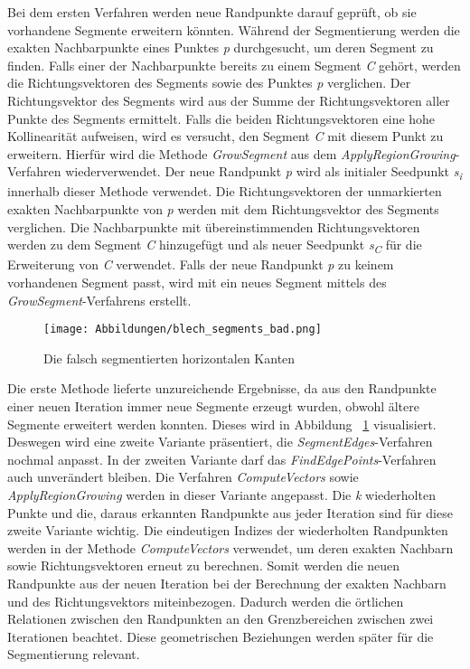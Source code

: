 Bei dem ersten Verfahren werden neue Randpunkte darauf geprüft, ob sie vorhandene Segmente erweitern könnten. Während der Segmentierung werden die exakten Nachbarpunkte eines Punktes \textit{p} durchgesucht, um deren Segment zu finden. Falls einer der Nachbarpunkte bereits zu einem Segment \textit{C} gehört, werden die Richtungsvektoren des Segments sowie des Punktes \textit{p} verglichen. Der Richtungsvektor des Segments wird aus der Summe der Richtungsvektoren aller Punkte des Segments ermittelt. Falls die beiden Richtungsvektoren eine hohe Kollinearität aufweisen, wird es versucht, den Segment \textit{C} mit diesem Punkt zu erweitern. Hierfür wird die Methode \textit{GrowSegment} aus dem \textit{ApplyRegionGrowing}-Verfahren wiederverwendet. Der neue Randpunkt \textit{p} wird als initialer Seedpunkt \textit{s\textsubscript{i}} innerhalb dieser Methode verwendet. Die Richtungsvektoren der unmarkierten exakten Nachbarpunkte von \textit{p} werden mit dem Richtungsvektor des Segments verglichen. Die Nachbarpunkte mit übereinstimmenden Richtungsvektoren werden zu dem Segment \textit{C} hinzugefügt und als neuer Seedpunkt \textit{s\textsubscript{C}} für die Erweiterung von \textit{C} verwendet. Falls der neue Randpunkt \textit{p} zu keinem vorhandenen Segment passt, wird mit ein neues Segment mittels des \textit{GrowSegment}-Verfahrens erstellt.

\begin{figure}[b!]
	\texttt{[image: Abbildungen/blech\_segments\_bad.png]}
	\centering
	\caption{Die falsch segmentierten horizontalen Kanten}
	\label{fig: bad_segments}
\end{figure}

Die erste Methode lieferte unzureichende Ergebnisse, da aus den Randpunkte einer neuen Iteration immer neue Segmente erzeugt wurden, obwohl ältere Segmente erweitert werden konnten. Dieses wird in Abbildung ~\ref{fig: bad_segments} visualisiert. Deswegen wird eine zweite Variante präsentiert, die \textit{SegmentEdges}-Verfahren nochmal anpasst. In der zweiten Variante darf das \textit{FindEdgePoints}-Verfahren auch unverändert bleiben. Die Verfahren \textit{ComputeVectors} sowie \textit{ApplyRegionGrowing} werden in dieser Variante angepasst. Die \textit{k} wiederholten Punkte und die, daraus erkannten Randpunkte aus jeder Iteration sind für diese zweite Variante wichtig. Die eindeutigen Indizes der wiederholten Randpunkten werden in der Methode \textit{ComputeVectors} verwendet, um deren exakten Nachbarn sowie Richtungsvektoren erneut zu berechnen. Somit werden die neuen Randpunkte aus der neuen Iteration bei der Berechnung der exakten Nachbarn und des Richtungsvektors miteinbezogen. Dadurch werden die örtlichen Relationen zwischen den Randpunkten an den Grenzbereichen zwischen zwei Iterationen beachtet. Diese geometrischen Beziehungen werden später für die Segmentierung relevant.

